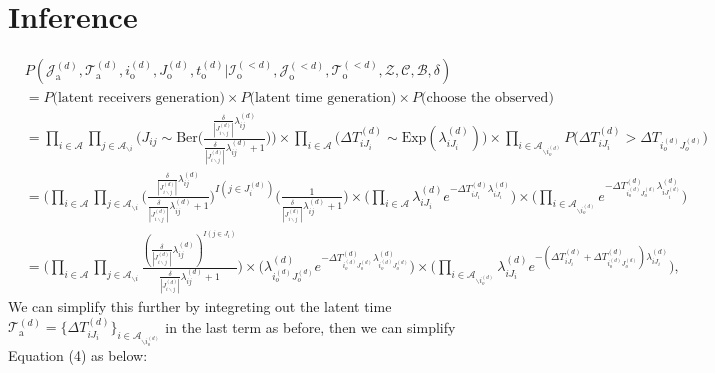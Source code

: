 \documentclass[a4paper]{article}
\begin{document}
\section{Inference}
\begin{equation}
\begin{aligned}
&P(\mathcal{J}^{(d)}_{\mbox{a}}, \mathcal{T}^{(d)}_{\mbox{a}}, i^{(d)}_{\mbox{o}}, J^{(d)}_{\mbox{o}}, t^{(d)}_{\mbox{o}} |\mathcal{I}^{(<d)}_{\mbox{o}}, \mathcal{J}^{(<d)}_{\mbox{o}}, \mathcal{T}^{(<d)}_{\mbox{o}}, \mathcal{Z}, \mathcal{C}, \mathcal{B}, \delta)\\&=P\Big(\mbox{latent receivers generation}\Big) \times P\Big(\mbox{latent time generation}\Big)\times P\Big(\mbox{choose the observed}\Big) \\&
=\prod_{i\in \mathcal{A}}\prod_{j\in \mathcal{A}_{\backslash i}}\Big(J_{ij}\sim \mbox{Ber}\Big(\frac{\frac{\delta}{|J^{(d)}_{i \backslash j}|}\lambda^{(d)}_{ij}}{\frac{\delta}{|J^{(d)}_{i\backslash j}|}\lambda^{(d)}_{ij}+1}\Big)\Big) \times \prod_{i\in \mathcal{A}}\Big(\Delta T^{(d)}_{iJ_i}\sim\mbox{Exp}(\lambda^{(d)}_{iJ_i})\Big) \times \prod_{i\in \mathcal{A}_{\backslash i_o^{(d)}}} P\Big(\Delta T^{(d)}_{i{J_i}} > \Delta T_{i_{o}^{(d)}{J_{o}^{(d)}}}\Big)\\&
=\Big(\prod_{i\in \mathcal{A}}\prod_{j\in \mathcal{A}_{\backslash i}}\big(\frac{\frac{\delta}{|J^{(d)}_{i \backslash j}|}\lambda^{(d)}_{ij}}{\frac{\delta}{|J^{(d)}_{i\backslash j}|}\lambda^{(d)}_{ij}+1}\big)^{I(j \in J_i^{(d)})}\big(\frac{1}{\frac{\delta}{|J^{(d)}_{i\backslash j}|}\lambda^{(d)}_{ij}+1}\Big)\times \Big(\prod_{i \in\mathcal{A}}\lambda^{(d)}_{iJ_i}e^{-\Delta T^{(d)}_{iJ_i}\lambda^{(d)}_{iJ_i}}\Big)\times \Big( \prod_{i\in \mathcal{A}_{\backslash i_o^{(d)}}} e^{-\Delta T^{(d)}_{i_o^{(d)}J_o^{(d)}}\lambda^{(d)}_{iJ^{(d)}_{i}}}\Big)
\\&
=\Big(\prod_{i\in \mathcal{A}} \prod_{j\in \mathcal{A}_{\backslash i}}\frac{(\frac{\delta}{|J^{(d)}_{i \backslash j}|}\lambda^{(d)}_{ij})^{I(j \in J_i)}}{\frac{\delta}{|J^{(d)}_{i \backslash j}|}\lambda^{(d)}_{ij}+1}\Big)\times\Big(\lambda^{(d)}_{i_o^{(d)}J_o^{(d)}}e^{-\Delta T^{(d)}_{i_o^{(d)}J_o^{(d)}}\lambda^{(d)}_{i_o^{(d)}J_o^{(d)}}}\Big)\times \Big( \prod_{i\in \mathcal{A}_{\backslash i_o^{(d)}}} \lambda^{(d)}_{iJ_i}e^{-(\Delta T^{(d)}_{iJ_i} + \Delta T^{(d)}_{i_o^{(d)}J_o^{(d)}})\lambda^{(d)}_{iJ_i}}\Big),
\end{aligned}
\end{equation}
We can simplify this further by integreting out the latent time $\mathcal{T}^{(d)}_{\mbox{a}}=\{\Delta T^{(d)}_{iJ_i}\}_{i \in \mathcal{A}_{\backslash i_o^{(d)}}}$ in the last term as before, then we can simplify Equation (4) as below:
\end{document}
